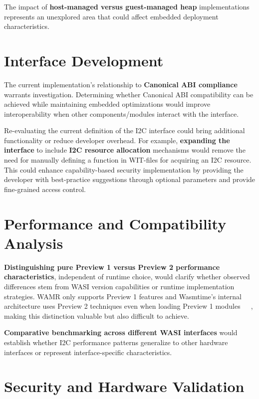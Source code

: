 The impact of \textbf{host-managed versus guest-managed heap} implementations represents an unexplored area that could affect embedded deployment characteristics.

\section*{Interface Development}
\label{sec:interface-development}

The current implementation's relationship to \textbf{Canonical ABI compliance} warrants investigation. Determining whether Canonical ABI compatibility can be achieved while maintaining embedded optimizations would improve interoperability when other components/modules interact with the interface.

Re-evaluating the current definition of the I2C interface could bring additional functionality or reduce developer overhead. For example, \textbf{expanding the interface} to include \textbf{I2C resource allocation} mechanisms would remove the need for manually defining a function in WIT-files for acquiring an I2C resource. This could enhance capability-based security implementation by providing the developer with best-practice suggestions through optional parameters and provide fine-grained access control.

\section*{Performance and Compatibility Analysis}
\label{sec:performance-compatibility}

\textbf{Distinguishing pure Preview 1 versus Preview 2 performance characteristics}, independent of runtime choice, would clarify whether observed differences stem from WASI version capabilities or runtime implementation strategies. WAMR only supports Preview 1 features and Wasmtime's internal architecture uses Preview 2 techniques even when loading Preview 1 modules~\cite{wasmtime_and_cranelift_2023}~\cite{wasmtime_p1_crate_docs}~\cite{wasmtime_p2_crate_docs}, making this distinction valuable but also difficult to achieve.

\textbf{Comparative benchmarking across different WASI interfaces} would establish whether I2C performance patterns generalize to other hardware interfaces or represent interface-specific characteristics.

\section*{Security and Hardware Validation}
\label{sec:security-hardware}

